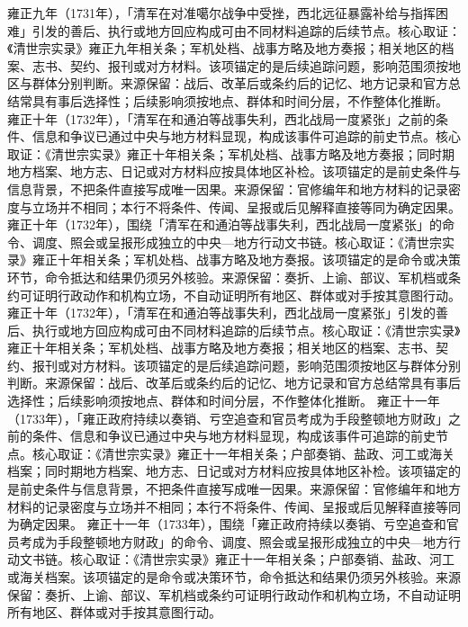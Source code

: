 雍正九年（1731年），「清军在对准噶尔战争中受挫，西北远征暴露补给与指挥困难」引发的善后、执行或地方回应构成可由不同材料追踪的后续节点。核心取证：《清世宗实录》雍正九年相关条；军机处档、战事方略及地方奏报；相关地区的档案、志书、契约、报刊或对方材料。该项锚定的是后续追踪问题，影响范围须按地区与群体分别判断。来源保留：战后、改革后或条约后的记忆、地方记录和官方总结常具有事后选择性；后续影响须按地点、群体和时间分层，不作整体化推断。
雍正十年（1732年），「清军在和通泊等战事失利，西北战局一度紧张」之前的条件、信息和争议已通过中央与地方材料显现，构成该事件可追踪的前史节点。核心取证：《清世宗实录》雍正十年相关条；军机处档、战事方略及地方奏报；同时期地方档案、地方志、日记或对方材料应按具体地区补检。该项锚定的是前史条件与信息背景，不把条件直接写成唯一因果。来源保留：官修编年和地方材料的记录密度与立场并不相同；本行不将条件、传闻、呈报或后见解释直接等同为确定因果。
雍正十年（1732年），围绕「清军在和通泊等战事失利，西北战局一度紧张」的命令、调度、照会或呈报形成独立的中央—地方行动文书链。核心取证：《清世宗实录》雍正十年相关条；军机处档、战事方略及地方奏报。该项锚定的是命令或决策环节，命令抵达和结果仍须另外核验。来源保留：奏折、上谕、部议、军机档或条约可证明行政动作和机构立场，不自动证明所有地区、群体或对手按其意图行动。
雍正十年（1732年），「清军在和通泊等战事失利，西北战局一度紧张」引发的善后、执行或地方回应构成可由不同材料追踪的后续节点。核心取证：《清世宗实录》雍正十年相关条；军机处档、战事方略及地方奏报；相关地区的档案、志书、契约、报刊或对方材料。该项锚定的是后续追踪问题，影响范围须按地区与群体分别判断。来源保留：战后、改革后或条约后的记忆、地方记录和官方总结常具有事后选择性；后续影响须按地点、群体和时间分层，不作整体化推断。
雍正十一年（1733年），「雍正政府持续以奏销、亏空追查和官员考成为手段整顿地方财政」之前的条件、信息和争议已通过中央与地方材料显现，构成该事件可追踪的前史节点。核心取证：《清世宗实录》雍正十一年相关条；户部奏销、盐政、河工或海关档案；同时期地方档案、地方志、日记或对方材料应按具体地区补检。该项锚定的是前史条件与信息背景，不把条件直接写成唯一因果。来源保留：官修编年和地方材料的记录密度与立场并不相同；本行不将条件、传闻、呈报或后见解释直接等同为确定因果。
雍正十一年（1733年），围绕「雍正政府持续以奏销、亏空追查和官员考成为手段整顿地方财政」的命令、调度、照会或呈报形成独立的中央—地方行动文书链。核心取证：《清世宗实录》雍正十一年相关条；户部奏销、盐政、河工或海关档案。该项锚定的是命令或决策环节，命令抵达和结果仍须另外核验。来源保留：奏折、上谕、部议、军机档或条约可证明行政动作和机构立场，不自动证明所有地区、群体或对手按其意图行动。
